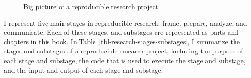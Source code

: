 \documentclass[
  letterpaper,
]{latex/krantz}
\theoremstyle{definition}
\theoremstyle{remark}
\begin{document}
\begin{figure}[!htb]


\caption{\label{fig-big-picture}Big picture of a reproducible research
project}

\end{figure}%

I represent five main stages in reproducible research: frame, prepare,
analyze, and communicate. Each of these stages, and substages are
represented as parts and chapters in this book. In
Table~\ref{tbl-research-stages-substages}, I summarize the stages and
substages of a reproducible research project, including the purpose of
each stage and substage, the code that is used to execute the stage and
substage, and the input and output of each stage and substage.
\end{document}
